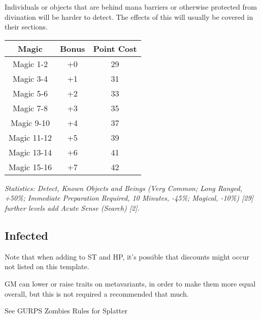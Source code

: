 \begin{multicols*}{3}
	Individuals or objects that are behind mana barriers or otherwise protected from divination will be harder to detect. The effects of this will usually be covered in their sections. 
	
	\begin{center}
		\begin{tabular}{|c|c|c|}
			\hline
			Magic & Bonus & Point Cost\\
			\hline
			\hline
			Magic 1-2 & +0 & 29 \\
			Magic 3-4 & +1 & 31 \\
			Magic 5-6 & +2 & 33 \\
			Magic 7-8 & +3 & 35 \\
			Magic 9-10 & +4 & 37 \\
			Magic 11-12 & +5 & 39 \\
			Magic 13-14 & +6 & 41 \\
			Magic 15-16 & +7 & 42 \\
			\hline
		\end{tabular}
	\end{center}
	
	\textcolor{OliveGreen}{\textit{Statistics: Detect, Known Objects and Beings (Very Common; Long Ranged, +50\%; Immediate Preparation Required, 10 Minutes, -45\%; Magical, -10\%) [29] further levels add Acute Sense (Search) [2].}}
	
	\subsection{Infected}
	
	Note that when adding to ST and HP, it's possible that discounts might occur not listed on this template.
	
	GM can lower or raise traits on metavariants, in order to make them more equal overall, but this is not required a recommended that much.
	
	See GURPS Zombies Rules for Splatter
	

\end{multicols*}
